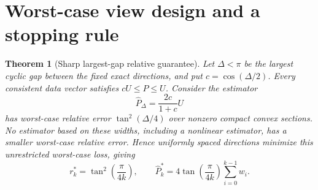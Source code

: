 \documentclass[11pt,a4paper]{article}
\newtheorem{theorem}{Theorem}
\begin{document}
\section{Worst-case view design and a stopping rule}
\begin{theorem}[Sharp largest-gap relative guarantee]
\label{thm:angles}
Let $\Delta<\pi$ be the largest cyclic gap between the fixed exact directions, and put $c=\cos(\Delta/2)$. Every consistent data vector satisfies $cU\le P\le U$. Consider the estimator
\begin{equation}
\widehat P_\Delta=\frac{2c}{1+c}U
\end{equation}
has worst-case relative error $\tan^2(\Delta/4)$ over nonzero compact convex sections. No estimator based on these widths, including a nonlinear estimator, has a smaller worst-case relative error. Hence uniformly spaced directions minimize this unrestricted worst-case loss, giving
\begin{equation}
r_k^*=\tan^2\!\left(\frac{\pi}{4k}\right),\qquad
\widehat P_k^*=4\tan\!\left(\frac{\pi}{4k}\right)\sum_{i=0}^{k-1}w_i.
\label{eq:uniform}
\end{equation}
\end{theorem}
\end{document}
